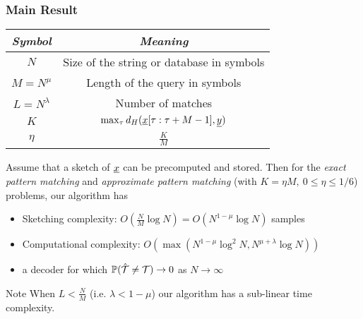 	 \begin{frame} \frametitle{Main Result}

	{\small
	\begin{table}[h!]
		\begin{center}
			\begin{tabular}{|c|c|} 	
				\hline		
				\textit{Symbol}		&  \textit{Meaning} \\		
				\hline
				$N$           		& Size of the string or database in symbols \\
				\hline
				$M = N^{\mu}$       & Length of the query in symbols \\
				\hline
				$L = N^\lambda$    &   Number of matches \\
				\hline
				$K$             &$\max_{\tau}d_{H}(\underline{x}[\tau:\tau+M-1],\underline{y})$\\
				\hline
				$\eta$             &$\frac{K}{M}$\\
				\hline
			\end{tabular}
		\end{center}
	\end{table}
    }	
     	
    \vspace{-2.5mm}
	 \begin{theorem}
	 	Assume that a sketch of $\underline{x}$ can be precomputed and stored. Then for the {\it exact pattern matching} and {\it approximate pattern matching} (with $K = \eta M,~ 0 \leq \eta \leq 1/6$) problems, our algorithm has
	 	\begin{itemize}
	 		\item \alert{Sketching complexity:} {\color{blue} $O(\frac{N}{M}\log N)=O(N^{1-\mu}\log N)$} \alert{samples}
	 		\item \alert{Computational complexity:}
	 		{\color{blue}$O(\max(N^{1-\mu}\log^2 N, N^{\mu+\lambda}\log N ))$}	 		
	 		\item a decoder for which $\mathbb{P}(\hat{{\mathcal{T}}} \neq \mathcal{T}) \rightarrow 0$ as $N \rightarrow \infty$
	 	\end{itemize}
	 \end{theorem}
	 \pause
	 \vspace{-0.5mm}
	 \begin{block}{\alert{Note}}
	 	When $L<\frac{N}{M}$ (i.e. $\lambda<1-\mu$) our algorithm has a {\color{blue}sub-linear time} complexity.
	 \end{block}	
\end{frame}




